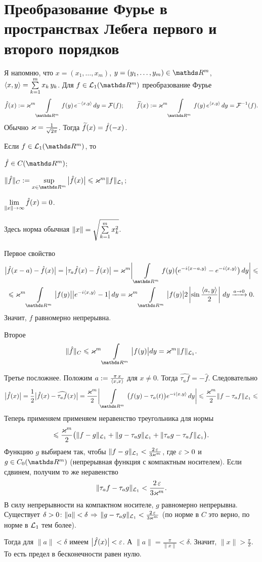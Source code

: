 \section{Преобразование Фурье в пространствах Лебега первого и второго порядков}
Я напомню, что $x=(x_1,\dots,x_m)$, $y=(y_1,\dots,y_m)\in\R^m$, $\langle x,y\rangle = \sum\limits_{k = 1}^{m} x_k\,y_k$. Для  $f\in\L_1(\R^m)$ преобразование Фурье
\[
  \hat f(x) :=\k^m\Gint{\R^m}f(y)\,e^{-\la x,y\ra}\,dy = \Fu(f);\qquad
  \Til f(x) :=\k^m\Gint{\R^m}f(y)\,e^{\la x,y\ra}\,dy = \Fu^{-1}(f).
\]
Обычно $\varkappa=\frac1{\sqrt{2\pi}}$. Тогда $\widetilde{f}{}(x) = \hat f(-x)$. 

\begin{Lem}\label{RimLeb}
  Если $f\in\L_1(\R^m)$, то
\begin{roItems}
\item $\hat f\in C(\R^m)$;
\item $\|\hat f\|_C:=\sup\limits_{x\in\R^m}\big|\hat f(x)\big|\le\k^m\|f\|_{\L_1}$;
\item $\lim\limits_{\|x\|\rightarrow\infty}\hat f(x)=0$.
\end{roItems}
\end{Lem}
Здесь норма обычная $\|x\| = \sqrt{\sum\limits_{k = 1}^{m}x_k^2}$.

\begin{Proof}
  Первое свойство
\begin{multline*}
  \big|\hat f(x-a)-\hat f(x)\big| = \big|\tau_a\hat f(x)-\hat f(x)\big| =
  \k^m\bigg|\Gint{\R^m}f(y)\big(e^{-i\la x-a,y\ra} - e^{-i\la x,y\ra}\big)\,dy\bigg|\le\\ \le
  \k^m\Gint{\R^m}\big|f(y)\big|\big| e^{-i\la x,y\ra}-1\big|\,dy = 
  \k^m\Gint{\R^m}\big|f(y)\big| 2\left|\sin\frac{\la a,y\ra}2\right|\,dy\xrightarrow{a\to0}0.
\end{multline*}
Значит, $f$ равномерно непрерывна.

Второе
\[
  \|\hat f\|_C\le \k^m\Gint{\R^m}\big|f(y)\big|dy = \k^m\|f\|_{\L_1}.
\]

Третье посложнее. Положим $a:=\frac{\pi\,x}{\langle x,x\rangle}$ для $x\ne0$. Тогда $\widehat{\tau_a f} = -\hat f$. Следовательно
\[
  \big|\hat f(x)\big| = \frac12\big|\hat f(x)-\widehat{\tau_af}(x)\big| = 
 \frac{\k^m}2\bigg|\Gint{\R^m}\big(f(y)-\tau_a(t)\big)e^{-i\la x,y\ra}\,dy\bigg|\le
\frac{\k^m}2 \|f-\tau_af\|_{\L_1}\le
\]
Теперь применяем применяем неравенство треугольника для нормы
\[
  \leqslant\frac{\varkappa^m}2\big(\|f-g\|_{\mathcal L_1}+\|g-\tau_ag\|_{\mathcal L_1}+\|\tau_ag-\tau_af\|_{\mathcal L_1}\big).
\]
Функцию $g$ выбираем так, чтобы $\|f-g\|_{\mathcal L_1}<\frac{2\,\varepsilon}{3\varkappa^m}$, где $\varepsilon>0$ и $g\in C_0(\R^m)$ (непрерывная функция с компактным носителем). Если сдвинем, получим то же неравенство
\[
 \|\tau_a f-\tau_ag\|_{\mathcal L_1}<\frac{2\,\varepsilon}{3\varkappa^m}.
\]
В силу непрерывности на компактном носителе, $g$ равномерно непрерывна. Существует $\delta>0\colon \|a\|<\delta\hspace{1pt plus1pt}\Rightarrow\hspace{1pt plus1pt} \|g-\tau_ag\|_{\mathcal L_1}<\frac{2\,\varepsilon}{3\varkappa^m}$ (по норме в $C$ это верно, по норме в $\mathcal L_1$ тем более).

Тогда для $\|a\|<\delta$ имеем $\big|\hat f(x)\big|<\varepsilon$. А $\|a\| = \frac\pi{\|x\|}<\delta$. Значит, $\|x\|>\frac\pi\delta$. То есть предел в бесконечности равен нулю.
\end{Proof}


